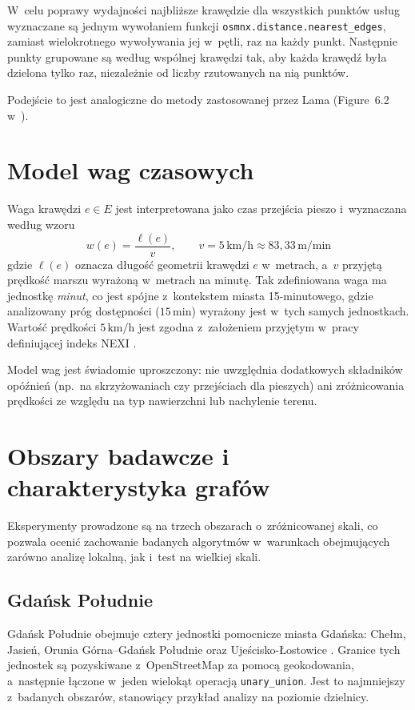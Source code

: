 W~celu poprawy wydajności najbliższe krawędzie dla wszystkich punktów usług
wyznaczane są jednym wywołaniem funkcji \texttt{osmnx.\allowbreak distance.\allowbreak nearest\_\allowbreak edges},
zamiast wielokrotnego wywoływania jej w~pętli, raz na każdy punkt.
Następnie punkty grupowane są według wspólnej krawędzi tak, aby każda krawędź była dzielona
tylko raz, niezależnie od liczby rzutowanych na nią punktów.

Podejście to jest analogiczne do metody zastosowanej przez Lama
(Figure~6.2 w~\cite{Lam2024}).

\section{Model wag czasowych}
\label{sec:dane:wagi}

Waga krawędzi $e \in E$ jest interpretowana jako czas przejścia pieszo
i~wyznaczana według wzoru
\[
w(e) = \frac{\ell(e)}{v},
\qquad
v = 5\,\text{km/h}
\approx 83{,}33\,\text{m/min}
\]
gdzie $\ell(e)$ oznacza długość geometrii krawędzi $e$ w~metrach,
a~$v$ przyjętą prędkość marszu wyrażoną w~metrach na minutę.
Tak zdefiniowana waga ma jednostkę \emph{minut}, co jest spójne
z~kontekstem miasta 15-minutowego, gdzie analizowany próg dostępności
($15\,$min) wyrażony jest w~tych samych jednostkach.
Wartość prędkości $5\,\text{km/h}$ jest zgodna z~założeniem przyjętym
w~pracy definiującej indeks NEXI \cite{olivari2023presenting}.

Model wag jest świadomie uproszczony: nie uwzględnia dodatkowych składników opóźnień
(np.\ na skrzyżowaniach czy przejściach dla pieszych) ani zróżnicowania prędkości
ze względu na typ nawierzchni lub nachylenie terenu.

\section{Obszary badawcze i charakterystyka grafów}
\label{sec:dane:obszary}

Eksperymenty prowadzone są na trzech obszarach o~zróżnicowanej skali,
co pozwala ocenić zachowanie badanych algorytmów w~warunkach obejmujących
zarówno analizę lokalną, jak i~test na wielkiej skali.

\subsection{Gdańsk Południe}

Gdańsk Południe obejmuje cztery jednostki pomocnicze miasta Gdańska:
Chełm, Jasień, Orunia Górna--Gdańsk Południe oraz Ujeścisko-Łostowice \cite{wiki:gdansk_poludnie}.
Granice tych jednostek są pozyskiwane z~OpenStreetMap za pomocą geokodowania,
a~następnie łączone w~jeden wielokąt operacją \texttt{unary\_union}.
Jest to najmniejszy z~badanych obszarów, stanowiący przykład analizy na poziomie dzielnicy.

